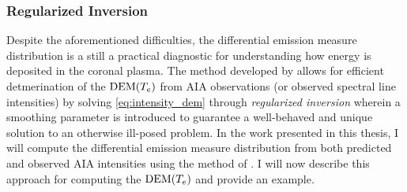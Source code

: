 \subsubsection{Regularized Inversion}\label{subsubsec:dem_regularized_inversion}

Despite the aforementioned difficulties, the differential emission measure distribution is a still a practical diagnostic for understanding how energy is deposited in the coronal plasma. The method developed by \citet{hannah_differential_2012} allows for efficient detmerination of the $\textup{DEM}(T_e)$ from AIA observations (or observed spectral line intensities) by solving \autoref{eq:intensity_dem} through \textit{regularized inversion} wherein a smoothing parameter is introduced to guarantee a well-behaved and unique solution to an otherwise ill-posed problem. In the work presented in this thesis, I will compute the differential emission measure distribution from both predicted and observed AIA intensities using the method of \citet{hannah_differential_2012}. I will now describe this approach for computing the $\textup{DEM}(T_e)$ and provide an example.

